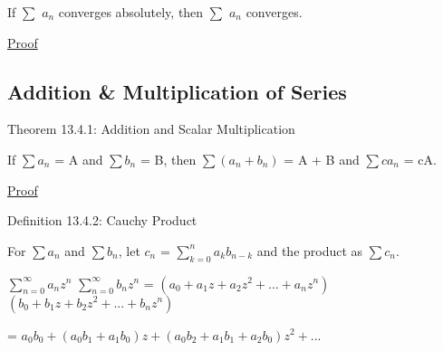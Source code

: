     \begin{adjustbox}{minipage=14cm, right, vspace=0.1cm 0cm}
        If $\sum$ $a_n$ converges absolutely, then $\sum$ $a_n$ converges.
    \end{adjustbox}

{ \color{magenta} \underline{Proof} }






\subsection{ Addition \& Multiplication of Series }

{ \color{red} Theorem 13.4.1: Addition and Scalar Multiplication }

    \begin{adjustbox}{minipage=14cm, right, vspace=0.1cm 0cm}
        If $\sum a_n$ = A and $\sum b_n$ = B, then
        $\sum (a_n + b_n)$ = A + B and $\sum ca_n$ = cA.
    \end{adjustbox}

{ \color{magenta} \underline{Proof} }


    \vspace{0.5cm}

{ \color{blue} Definition 13.4.2: Cauchy Product }

    \begin{adjustbox}{minipage=14cm, right, vspace=0.1cm 0cm}
        For $\sum a_n$ and $\sum b_n$, let
        $c_n$ = $\sum_{k=0}^n a_k b_{n-k}$
        and the product as $\sum c_n$.

        \vspace{0.2cm}

        $\sum_{n=0}^{\infty} a_n z^n$ $\sum_{n=0}^{\infty} b_n z^n$
        = $(a_0 + a_1z + a_2z^2 + ... + a_nz^n)$
        $(b_0 + b_1z + b_2z^2 + ... + b_nz^n)$

        \hspace{3.9cm}
        = $a_0b_0 + (a_0b_1 + a_1b_0)z + (a_0b_2 + a_1b_1 + a_2b_0)z^2 + ... $
    \end{adjustbox}

